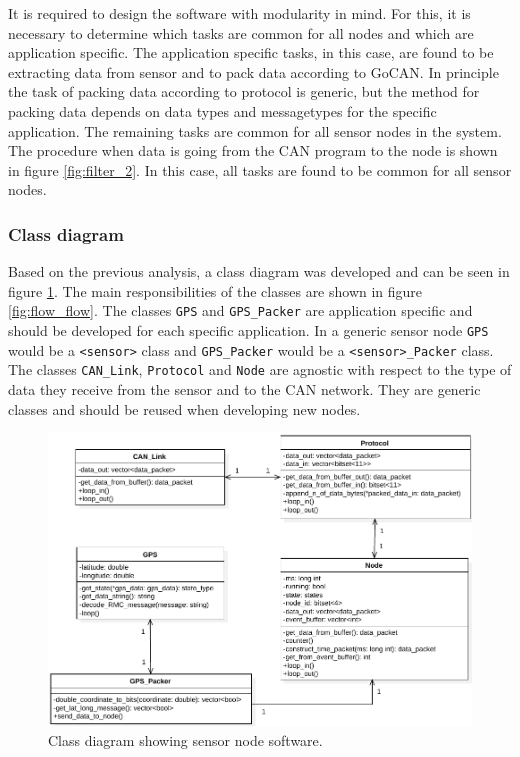 It is required to design the software with modularity in mind.
For this, it is necessary to determine which tasks are common for all nodes and which are application specific.
The application specific tasks, in this case, are found to be extracting data from sensor and to pack data according to GoCAN.
In principle the task of packing data according to protocol is generic, but the method for packing data depends on data types and messagetypes for the specific application.
The remaining tasks are common for all sensor nodes in the system. 
The procedure when data is going from the CAN program to the node is shown in figure \ref{fig:filter_2}.
In this case, all tasks are found to be common for all sensor nodes.

\subsubsection*{Class diagram}
Based on the previous analysis, a class diagram was developed and can be seen in figure \ref{fig:node_class_diagram}.
The main responsibilities of the classes are shown in figure \ref{fig:flow_flow}.
The classes \texttt{GPS} and \texttt{GPS\_Packer} are application specific and should be developed for each specific application.
In a generic sensor node \texttt{GPS} would be a \texttt{<sensor>} class and \texttt{GPS\_Packer}  would be a \texttt{<sensor>\_Packer} class. 
The classes \texttt{CAN\_Link}, \texttt{Protocol} and \texttt{Node} are agnostic with respect to the type of data they receive from the sensor and to the CAN network.
They are generic classes and should be reused when developing new nodes.

\begin{figure}[!h]
\centering
\includegraphics[width=1\textwidth]{graphics/ClassDiagram_NodeSimple}
\caption{Class diagram showing sensor node software.}
\label{fig:node_class_diagram}
\end{figure}

